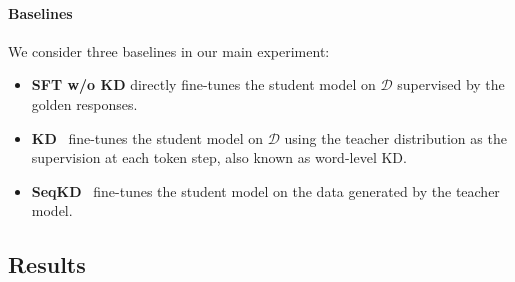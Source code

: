 \documentclass{article}
\begin{document}
\paragraph{Baselines} 
We consider three baselines in our main experiment:
\begin{itemize}[leftmargin=12pt,topsep=-1pt]
    \item \textbf{SFT w/o KD} directly fine-tunes the student model on $\mathcal{D}$ supervised by the golden responses.
    \item \textbf{KD}~\citep{distilbert,lightpaff} fine-tunes the student model on $\mathcal{D}$ using the teacher distribution as the supervision at each token step, also known as word-level KD.
    \item \textbf{SeqKD}~\citep{skd,vicuna,alpaca,ITGPT4,lima} fine-tunes the student model on the data generated by the teacher model.
\end{itemize}

\subsection{Results}
\end{document}
